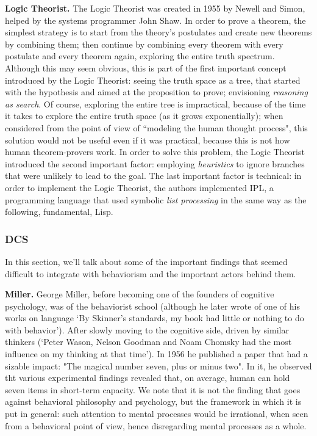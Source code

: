 \documentclass[../main.tex]{subfiles}
\begin{document}
\vspace{4pt}
\textbf{Logic Theorist.}
The Logic Theorist was created in 1955 by Newell and Simon, helped by the systems programmer John Shaw. In order to prove a theorem, the simplest strategy is to start from the theory's postulates and create new theorems by combining them; then continue by combining every theorem with every postulate and every theorem again, exploring the entire truth spectrum. Although this may seem obvious, this is part of the first important concept introduced by the Logic Theorist: seeing the truth space as a tree, that started with the hypothesis and aimed at the proposition to prove; envisioning \textit{reasoning as search}. Of course, exploring the entire tree is impractical, because of the time it takes to explore the entire truth space (as it grows exponentially); when considered from the point of view of ``modeling the human thought process", this solution would not be useful even if it was practical, because this is not how human theorem-provers work. In order to solve this problem, the Logic Theorist introduced the second important factor: employing \textit{heuristics} to ignore branches that were unlikely to lead to the goal. The last important factor is technical: in order to implement the Logic Theorist, the authors implemented IPL, a programming language that used symbolic \textit{list processing} in the same way as the following, fundamental, Lisp.

\subsubsection{DCS}
In this section, we'll talk about some of the important findings that seemed difficult to integrate with behaviorism and the important actors behind them.

\vspace{4pt}
\textbf{Miller.}
George Miller, before becoming one of the founders of cognitive psychology, was of the behaviorist school (although he later wrote of one of his works on language \enquote*{By Skinner’s standards, my book had little or nothing to do with behavior}\cite{millerCognitiveRevolutionHistorical2003}). After slowly moving to the cognitive side, driven by similar thinkers (\enquote*{Peter Wason, Nelson Goodman and Noam Chomsky had the most influence on my thinking at that time}). In 1956 he published a paper that had a sizable impact: "The magical number seven, plus or minus two". In it, he observed tht various experimental findings revealed that, on average, human can hold seven items in short-term capacity. We note that it is not the finding that goes against behavioral philosophy and psychology, but the framework in which it is put in general: such attention to mental processes would be irrational, when seen from a behavioral point of view, hence disregarding mental processes as a whole. 
\end{document}
